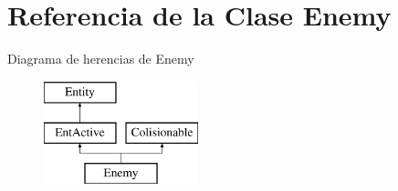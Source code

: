 \hypertarget{classEnemy}{\section{Referencia de la Clase Enemy}
\label{classEnemy}
}
Diagrama de herencias de Enemy\begin{figure}[H]
\begin{center}
\leavevmode
\includegraphics[height=3.000000cm]{classEnemy}
\end{center}
\end{figure}
